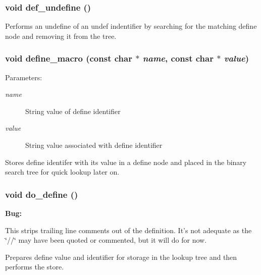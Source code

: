 \subsubsection{\setlength{\rightskip}{0pt plus 5cm}void def\_\-undefine ()\hspace{0.3cm}{\tt  [static]}}\label{pplexer_8c_a133}


Performs an undefine of an undef indentifier by searching for the matching define node and removing it from the tree. 
\subsubsection{\setlength{\rightskip}{0pt plus 5cm}void define\_\-macro (const char $\ast$ {\em name}, const char $\ast$ {\em value})}\label{pplexer_8c_a142}


\begin{Desc}
\item[Parameters: ]\par
\begin{description}
\item[{\em 
name}]String value of define identifier \item[{\em 
value}]String value associated with define identifier\end{description}
\end{Desc}
Stores define identifer with its value in a define node and placed in the binary search tree for quick lookup later on. 
\subsubsection{\setlength{\rightskip}{0pt plus 5cm}void do\_\-define ()\hspace{0.3cm}{\tt  [static]}}\label{pplexer_8c_a134}




\begin{Desc}
\item[{\bf Bug: }]\par
This strips trailing line comments out of the definition. It's not adequate as the \char`\"{}//\char`\"{} may have been quoted or commented, but it will do for now.\end{Desc}


Prepares define value and identifier for storage in the lookup tree and then performs the store. 
